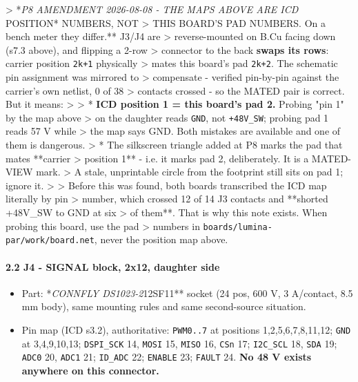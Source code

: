 \documentclass[11pt,a4paper]{article}
\begin{document}
\textgreater{} {*}\emph{P8 AMENDMENT 2026-08-08 - THE MAPS ABOVE ARE ICD }POSITION{*} NUMBERS, NOT \textgreater{} THIS BOARD'S PAD NUMBERS. On a bench meter they differ.{*}{*} J3/J4 are \textgreater{} reverse-mounted on B.Cu facing down (s7.3 above), and flipping a 2-row \textgreater{} connector to the back \textbf{swaps its rows}: carrier position \texttt{2k+1} physically \textgreater{} mates this board's pad \texttt{2k+2}. The schematic pin assignment was mirrored to \textgreater{} compensate - verified pin-by-pin against the carrier's own netlist, 0 of 38 \textgreater{} contacts crossed - so the MATED pair is correct. But it means: \textgreater{} \textgreater{} {*} \textbf{ICD position 1 = this board's pad 2.} Probing "pin 1" by the map above \textgreater{}   on the daughter reads \texttt{GND}, not \texttt{+48V\_SW}; probing pad 1 reads 57 V while \textgreater{}   the map says GND. Both mistakes are available and one of them is dangerous. \textgreater{} {*} The silkscreen triangle added at P8 marks the pad that mates {*}{*}carrier \textgreater{}   position 1{*}{*} - i.e. it marks pad 2, deliberately. It is a MATED-VIEW mark. \textgreater{}   A stale, unprintable circle from the footprint still sits on pad 1; ignore it. \textgreater{} \textgreater{} Before this was found, both boards transcribed the ICD map literally by pin \textgreater{} number, which crossed 12 of 14 J3 contacts and {*}{*}shorted +48V\_SW to GND at six \textgreater{} of them{*}{*}. That is why this note exists. When probing this board, use the pad \textgreater{} numbers in \texttt{boards/lumina-par/work/board.net}, never the position map above.

\paragraph*{2.2 J4 - SIGNAL block, 2x12, daughter side}
\begin{itemize}
\item Part: {*}\emph{CONNFLY DS1023-2}12SF11{*}{*} socket (24 pos, 600 V, 3 A/contact,
8.5 mm body), same mounting rules and same second-source situation.
\item Pin map (ICD s3.2), authoritative: \texttt{PWM0..7} at positions 1,2,5,6,7,8,11,12;
\texttt{GND} at 3,4,9,10,13; \texttt{DSPI\_SCK} 14, \texttt{MOSI} 15, \texttt{MISO} 16, \texttt{CSn} 17;
\texttt{I2C\_SCL} 18, \texttt{SDA} 19; \texttt{ADC0} 20, \texttt{ADC1} 21; \texttt{ID\_ADC} 22; \texttt{ENABLE} 23;
\texttt{FAULT} 24. \textbf{No 48 V exists anywhere on this connector.}
\end{itemize}
\end{document}

